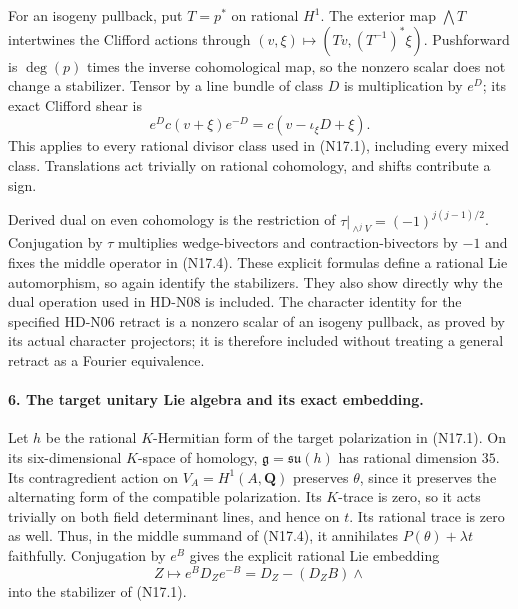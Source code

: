 For an isogeny pullback, put $T=p^*$ on rational $H^1$.
The exterior map $\bigwedge T$ intertwines the Clifford
actions through
$(v,\xi)\mapsto(Tv,(T^{-1})^*\xi)$.
Pushforward is $\deg(p)$ times the inverse cohomological
map, so the nonzero scalar does not change a stabilizer.
Tensor by a line bundle of class $D$ is multiplication
by $e^D$; its exact Clifford shear is
\[
 e^D c(v+\xi)e^{-D}=c(v-\iota_\xi D+\xi).
\]
This applies to every rational divisor class used in
(N17.1), including every mixed class. Translations act
trivially on rational cohomology, and shifts contribute a sign.

Derived dual on even cohomology is the restriction of
$\tau|_{\wedge^jV}=(-1)^{j(j-1)/2}$.
Conjugation by $\tau$ multiplies wedge-bivectors and
contraction-bivectors by $-1$ and fixes the middle
operator in (N17.4). These explicit formulas define a
rational Lie automorphism, so again identify the stabilizers.
They also show directly why the dual operation used in
HD-N08 is included. The character identity for the
specified HD-N06 retract is a nonzero scalar of an isogeny
pullback, as proved by its actual character projectors;
it is therefore included without treating a general
retract as a Fourier equivalence.

\paragraph{6. The target unitary Lie algebra and its exact embedding.}
Let $h$ be the rational $K$-Hermitian form of the target
polarization in (N17.1). On its six-dimensional $K$-space
of homology, $\mathfrak g=\mathfrak{su}(h)$ has rational
dimension $35$. Its contragredient action on
$V_A=H^1(A,\mathbf Q)$ preserves $\theta$, since it
preserves the alternating form of the compatible polarization.
Its $K$-trace is zero, so it acts trivially on both
field determinant lines, and hence on $t$. Its rational
trace is zero as well. Thus, in the middle summand of
(N17.4), it annihilates $P(\theta)+\lambda t$ faithfully.
Conjugation by $e^B$ gives the explicit rational Lie
embedding
\[
 Z\longmapsto e^BD_Ze^{-B}=D_Z-(D_ZB)\wedge
\]
into the stabilizer of (N17.1).

